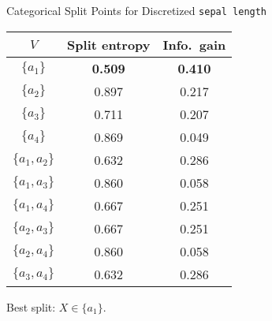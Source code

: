 \begin{frame}{Categorical Split Points for Discretized {\tt sepal length}}
\begin{center}
\renewcommand{\arraystretch}{1.1}
\begin{tabular}{|c|c|c|}
    \hline
    $V$ & Split entropy & Info.\ gain\\
    \hline
	$\{ a_1 \}$ & \textbf{0.509} & \textbf{0.410}\\
    $\{ a_2 \}$ & 0.897 & 0.217\\
    $\{ a_3 \}$ & 0.711 & 0.207\\
    $\{ a_4 \}$ & 0.869 & 0.049\\
    $\{ a_1, a_2\}$ & 0.632 & 0.286\\
    $\{ a_1, a_3\}$ & 0.860 & 0.058\\
    $\{ a_1, a_4\}$ & 0.667 & 0.251\\
    $\{ a_2, a_3\}$ & 0.667 & 0.251\\
    $\{ a_2, a_4\}$ & 0.860 & 0.058\\
    $\{ a_3, a_4\}$ & 0.632 & 0.286\\
    \hline
    \end{tabular}%
\end{center}
Best split: $X \in \{a_1\}$.
\end{frame}

